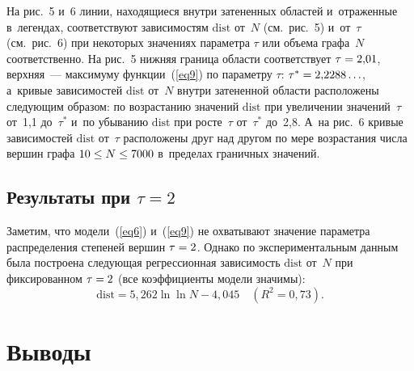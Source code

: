 \begin{multicols}{2}
На рис.~5 и~6 линии, находящиеся внут\-ри затененных областей и~отраженные в~легендах, соответствуют
зависимостям $\mathrm{dist}$ от~$N$ (см.\ рис.~5) и~от~$\tau$ (см.\ рис.~6) при некоторых
значениях па\-ра\-мет\-ра $\tau$ или объема графа~$N$ соответственно.
На рис.~5 ниж\-няя граница об\-ласти соответствует $\tau\hm=2{,}01$, верхняя~--- максимуму функции~(\ref{eq9}) 
по параметру $\tau$: $\tau^*\hm=2{,}2288\ldots$, а~кривые зависимостей $\mathrm{dist}$ от~$N$ внут\-ри затененной
об\-ласти расположены сле\-ду\-ющим образом: по воз\-рас\-та\-нию значений $\mathrm{dist}$ при увеличении значений~$\tau$ от~1,1
до~$\tau^*$ и~по убыванию $\mathrm{dist}$ при рос\-те~$\tau$ от~$\tau^*$ до~2,8. А~на рис.~6 кривые
зависимостей $\mathrm{dist}$ от~$\tau$ расположены друг над другом по мере воз\-рас\-та\-ния чис\-ла вершин графа
$10\hm\leq N\hm\leq 7000$ в~пределах граничных значений.

\vspace*{-9pt}


\subsection{Результаты при $\tau=2$}

\vspace*{-2pt}

Заметим, что модели~(\ref{eq6}) и~(\ref{eq9}) не охватывают значение па\-ра\-мет\-ра распределения степеней
вершин $\tau\hm=2$. Однако по экспериментальным данным была по\-стро\-ена сле\-ду\-ющая регрессионная за\-ви\-си\-мость
$\mathrm{dist}$ от~$N$ при фиксированном $\tau\hm=2$ (все коэффициенты модели значимы):
\begin{equation}
\label{eq10}
\mathrm{dist} = 5{,}262\ln\ln N - 4{,}045 \quad \left(R^2=0{,}73\right).
\end{equation}

\vspace*{-14.5pt}

\section{Выводы}

\vspace*{-2.5pt}


\end{multicols}
